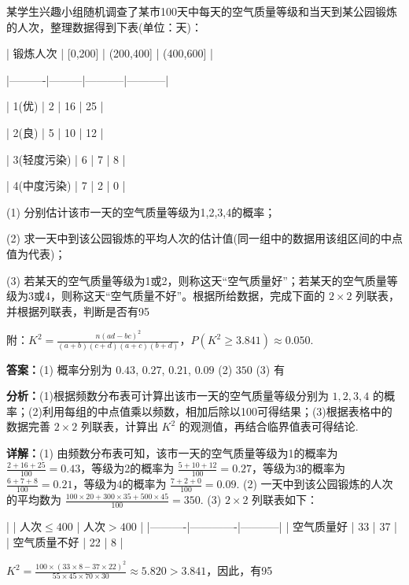 \begin{question}[points=12]
某学生兴趣小组随机调查了某市100天中每天的空气质量等级和当天到某公园锻炼的人次，整理数据得到下表(单位：天)：



| 锻炼人次 | [0,200] | (200,400] | (400,600] |

|----------|---------|-----------|-----------|

| 1(优)    | 2       | 16        | 25        |

| 2(良)    | 5       | 10        | 12        |

| 3(轻度污染) | 6    | 7         | 8         |

| 4(中度污染) | 7    | 2         | 0         |



(1) 分别估计该市一天的空气质量等级为1,2,3,4的概率；

(2) 求一天中到该公园锻炼的平均人次的估计值(同一组中的数据用该组区间的中点值为代表)；

(3) 若某天的空气质量等级为1或2，则称这天“空气质量好”；若某天的空气质量等级为3或4，则称这天“空气质量不好”。根据所给数据，完成下面的 $2\times2$ 列联表，并根据列联表，判断是否有95%



附：$K^2=\frac{n(ad-bc)^2}{(a+b)(c+d)(a+c)(b+d)}$，$P(K^2\geq3.841)\approx0.050$.
\begin{solution}
\textbf{答案：}(1) 概率分别为 $0.43$, $0.27$, $0.21$, $0.09$ (2) $350$ (3) 有

\textbf{分析：}(1)根据频数分布表可计算出该市一天的空气质量等级分别为 $1,2,3,4$ 的概率；(2)利用每组的中点值乘以频数，相加后除以100可得结果；(3)根据表格中的数据完善 $2\times2$ 列联表，计算出 $K^2$ 的观测值，再结合临界值表可得结论.

\textbf{详解：}(1) 由频数分布表可知，该市一天的空气质量等级为1的概率为 $\frac{2+16+25}{100}=0.43$，等级为2的概率为 $\frac{5+10+12}{100}=0.27$，等级为3的概率为 $\frac{6+7+8}{100}=0.21$，等级为4的概率为 $\frac{7+2+0}{100}=0.09$.
(2) 一天中到该公园锻炼的人次的平均数为 $\frac{100\times20+300\times35+500\times45}{100}=350$.
(3) $2\times2$ 列联表如下：

|          | 人次$\leq400$ | 人次$>400$ |
|----------|-------------|-----------|
| 空气质量好 | 33          | 37        |
| 空气质量不好 | 22          | 8         |

$K^2=\frac{100\times(33\times8-37\times22)^2}{55\times45\times70\times30}\approx5.820>3.841$，因此，有95%
\end{solution}
\end{question}

